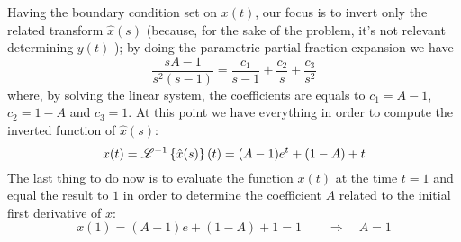 	Having the boundary condition set on $x(t)$, our focus is to invert only the related transform $\hat x(s)$ (because, for the sake of the problem, it's not relevant determining $y(t)$ ); by doing the parametric partial fraction expansion we have
	\[ \frac{sA - 1}{s^2(s-1)} = \frac{c_1}{s-1} + \frac{c_2}{s} + \frac{c_3}{s^2}  \]
	where, by solving the linear system, the coefficients are equals to $c_1 = A-1$, $c_2 = 1-A$ and $c_3 = 1$. At this point we have everything in order to compute the inverted function of $\hat x(s)$:
	\[ x(t) = \mathscr{L}^{-1} \left\{ \hat x(s) \right\}(t) = (A-1)e^t + (1-A) + t \]
	The last thing to do now is to evaluate the function $x(t)$ at the time $t=1$ and equal the result to $1$ in order to determine the coefficient $A$ related to the initial first derivative of $x$:
	\[ x(1) = (A-1) e + (1-A) + 1 = 1 \qquad \Rightarrow \quad A = 1 \]
	
	
	